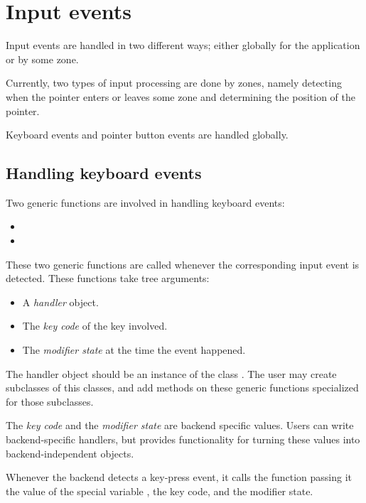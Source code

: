 \chapter{Input events}
\label{chap-input-events}

Input events are handled in two different ways; either globally for
the application or by some zone.  

Currently, two types of input processing are done by zones, namely
detecting when the pointer enters or leaves some zone
 and determining the position of the
pointer. 

Keyboard events and pointer button events are handled globally.

\section{Handling keyboard events}

Two generic functions are involved in handling keyboard events:

\begin{itemize}
\item {}
\item {}
\end{itemize}

These two generic functions are called whenever the corresponding
input event is detected.  These functions take tree arguments:

\begin{itemize}
\item A \emph{handler} object.
\item The \emph{key code} of the key involved.
\item The \emph{modifier state} at the time the event happened.
\end{itemize}

The handler object should be an instance of the class
.  The user may create subclasses of this classes,
and add methods on these generic functions specialized for those
subclasses.

The \emph{key code} and the \emph{modifier state} are backend specific
values.  Users can write backend-specific handlers, but \clim{}
provides functionality for turning these values into
backend-independent objects.

Whenever the backend detects a key-press event, it calls the function
 passing it the value of the special variable
, the key code, and the modifier state. 


